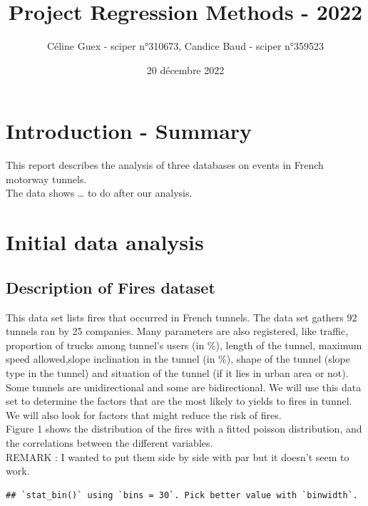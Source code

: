\documentclass[
]{article}
\title{Project Regression Methods - 2022}
\author{Céline Guex - sciper n°310673, Candice Baud - sciper n°359523}
\date{20 décembre 2022}
\begin{document}
\maketitle

\hypertarget{introduction---summary}{%
\section{Introduction - Summary}\label{introduction---summary}}

This report describes the analysis of three databases on events in
French motorway tunnels.\\
The data shows \ldots{} to do after our analysis.

\hypertarget{initial-data-analysis}{%
\section{Initial data analysis}\label{initial-data-analysis}}

\hypertarget{description-of-fires-dataset}{%
\subsection{Description of Fires
dataset}\label{description-of-fires-dataset}}

This data set lists fires that occurred in French tunnels. The data set
gathers 92 tunnels ran by 25 companies. Many parameters are also
registered, like traffic, proportion of trucks among tunnel's users (in
\%), length of the tunnel, maximum speed allowed,slope inclination in
the tunnel (in \%), shape of the tunnel (slope type in the tunnel) and
situation of the tunnel (if it lies in urban area or not). Some tunnels
are unidirectional and some are bidirectional. We will use this data set
to determine the factors that are the most likely to yields to fires in
tunnel. We will also look for factors that might reduce the risk of
fires.\\

Figure 1 shows the distribution of the fires with a fitted poisson
distribution, and the correlations between the different variables.\\

REMARK : I wanted to put them side by side with par but it doesn't seem
to work.\\

\begin{verbatim}
## `stat_bin()` using `bins = 30`. Pick better value with `binwidth`.
\end{verbatim}
\end{document}
